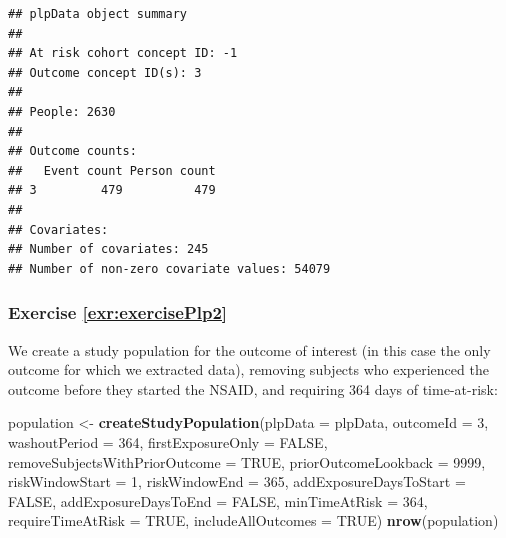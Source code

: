 \documentclass[11pt]{book}
\newenvironment{Shaded}{\begin{snugshade}}{\end{snugshade}}
\newcommand{\KeywordTok}[1]{\textcolor[rgb]{0.13,0.29,0.53}{\textbf{#1}}}
\newcommand{\DataTypeTok}[1]{\textcolor[rgb]{0.13,0.29,0.53}{#1}}
\newcommand{\DecValTok}[1]{\textcolor[rgb]{0.00,0.00,0.81}{#1}}
\newcommand{\StringTok}[1]{\textcolor[rgb]{0.31,0.60,0.02}{#1}}
\newcommand{\OtherTok}[1]{\textcolor[rgb]{0.56,0.35,0.01}{#1}}
\newcommand{\NormalTok}[1]{#1}
\theoremstyle{definition}
\theoremstyle{definition}
\theoremstyle{definition}
\theoremstyle{remark}
\begin{document}
\begin{verbatim}
## plpData object summary
## 
## At risk cohort concept ID: -1
## Outcome concept ID(s): 3
## 
## People: 2630
## 
## Outcome counts:
##   Event count Person count
## 3         479          479
## 
## Covariates:
## Number of covariates: 245
## Number of non-zero covariate values: 54079
\end{verbatim}

\subsubsection*{Exercise
\ref{exr:exercisePlp2}}\label{exercise-refexrexerciseplp2}

We create a study population for the outcome of interest (in this case
the only outcome for which we extracted data), removing subjects who
experienced the outcome before they started the NSAID, and requiring 364
days of time-at-risk:

\begin{Shaded}
\begin{Highlighting}[]
\NormalTok{population <-}\StringTok{ }\KeywordTok{createStudyPopulation}\NormalTok{(}\DataTypeTok{plpData =}\NormalTok{ plpData,}
                                    \DataTypeTok{outcomeId =} \DecValTok{3}\NormalTok{,}
                                    \DataTypeTok{washoutPeriod =} \DecValTok{364}\NormalTok{,}
                                    \DataTypeTok{firstExposureOnly =} \OtherTok{FALSE}\NormalTok{,}
                                    \DataTypeTok{removeSubjectsWithPriorOutcome =} \OtherTok{TRUE}\NormalTok{,}
                                    \DataTypeTok{priorOutcomeLookback =} \DecValTok{9999}\NormalTok{,}
                                    \DataTypeTok{riskWindowStart =} \DecValTok{1}\NormalTok{,}
                                    \DataTypeTok{riskWindowEnd =} \DecValTok{365}\NormalTok{,}
                                    \DataTypeTok{addExposureDaysToStart =} \OtherTok{FALSE}\NormalTok{,}
                                    \DataTypeTok{addExposureDaysToEnd =} \OtherTok{FALSE}\NormalTok{,}
                                    \DataTypeTok{minTimeAtRisk =} \DecValTok{364}\NormalTok{,}
                                    \DataTypeTok{requireTimeAtRisk =} \OtherTok{TRUE}\NormalTok{,}
                                    \DataTypeTok{includeAllOutcomes =} \OtherTok{TRUE}\NormalTok{)}
\KeywordTok{nrow}\NormalTok{(population)}
\end{Highlighting}
\end{Shaded}
\end{document}
